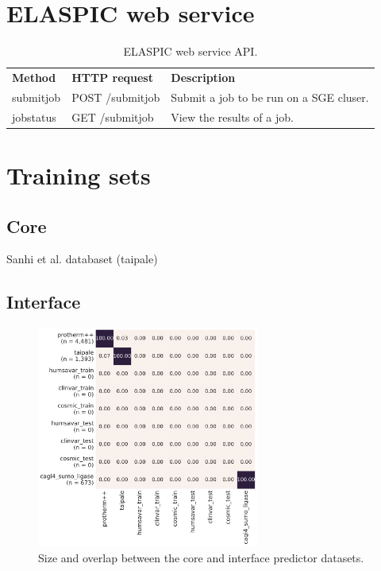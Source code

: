 \section{ELASPIC web service}

\begin{table}[H]
	\centering
	\caption{ELASPIC web service API.}
	\label{my-label}
	\begin{tabular}{lll}
	\textbf{Method} & \textbf{HTTP request} & \textbf{Description} \\
	submitjob & POST /submitjob & Submit a job to be run on a SGE cluser. \\
	jobstatus & GET /submitjob & View the results of a job.
	\end{tabular}
\end{table}



\section{Training sets}

\subsection{Core}

Sanhi et al. databaset (taipale)

\subsection{Interface}



\begin{figure}[ht]
	\centering
	\includegraphics[width=0.65\textwidth]{static/elaspic_training_set/data_statistics/training_set_overlap_data_df_core.pdf}
	\caption{Size and overlap between the core and interface predictor datasets.}
\end{figure}
